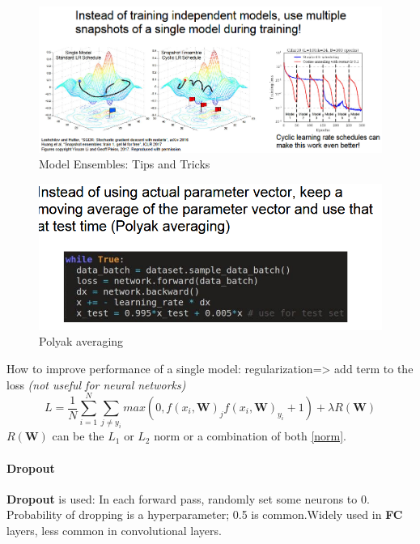 \documentclass[11pt]{article}
\begin{document}
\begin{figure}[h]
\centering
\captionsetup{justification=centering}
\includegraphics[width=1\linewidth]{L620.pdf}
\caption{ Model Ensembles: Tips and Tricks}
\label{fig:L620}
\end{figure}
\begin{figure}[h]
\centering
\captionsetup{justification=centering}
\includegraphics[width=0.7\linewidth]{L621.pdf}
\caption{ Polyak averaging}
\label{fig:L621}
\end{figure}
How to improve performance of a single model: regularization=> add term to the loss \textit{(not useful for neural networks)}
\begin{equation}
    L= \frac{1}{N} \sum_{i=1}^{N} \sum_{j\neq y_i} max(0,f(x_i,\mathbf{W})_j f(x_i,\mathbf{W})_{y_i} +1) +\lambda R(\mathbf{W})
\end{equation}{}
$R(\mathbf{W})$ can be the $L_1$ or $L_2$ norm or a combination of both \ref{norm}.
\clearpage
\paragraph{Dropout}
\textbf{Dropout} is used: In each forward pass, randomly set some neurons to 0. Probability of dropping is a hyperparameter; 0.5 is common.Widely used  in \textbf{FC} layers, less common in convolutional layers.
\end{document}
